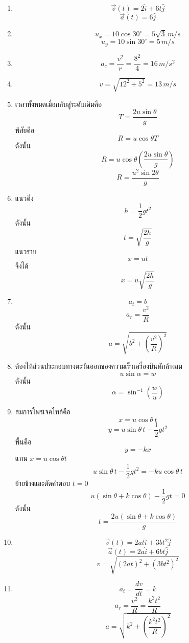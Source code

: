 \begin{enumerate}
    \item
    \[
    \vec{v}(t)=2\hat{i}+6t\hat{j}
    \]
    \[
    \vec{a}(t)=6\hat{j}
    \]

    \item
    \[
    u_x=10\cos30^\circ=5\sqrt{3}\,\si{m/s}
    \]
    \[
    u_y=10\sin30^\circ=5\,\si{m/s}
    \]

    \item
    \[
    a_c=\frac{v^2}{r}=\frac{8^2}{4}=16\,\si{m/s^2}
    \]

    \item
    \[
    v=\sqrt{12^2+5^2}=13\,\si{m/s}
    \]

    \item
    เวลาทั้งหมดเมื่อกลับสู่ระดับเดิมคือ
    \[
    T=\frac{2u\sin\theta}{g}
    \]
    พิสัยคือ
    \[
    R=u\cos\theta T
    \]
    ดังนั้น
    \[
    R=u\cos\theta\left(\frac{2u\sin\theta}{g}\right)
    \]
    \[
    R=\frac{u^2\sin2\theta}{g}
    \]

    \item
    แนวดิ่ง
    \[
    h=\frac{1}{2}gt^2
    \]
    ดังนั้น
    \[
    t=\sqrt{\frac{2h}{g}}
    \]
    แนวราบ
    \[
    x=ut
    \]
    จึงได้
    \[
    x=u\sqrt{\frac{2h}{g}}
    \]

    \item
    \[
    a_t=b
    \]
    \[
    a_r=\frac{v^2}{R}
    \]
    ดังนั้น
    \[
    a=\sqrt{b^2+\left(\frac{v^2}{R}\right)^2}
    \]

    \item
    ต้องให้ส่วนประกอบทางตะวันออกของความเร็วเครื่องบินหักล้างลม
    \[
    u\sin\alpha=w
    \]
    ดังนั้น
    \[
    \alpha=\sin^{-1}\left(\frac{w}{u}\right)
    \]

    \item
    สมการโพรเจคไทล์คือ
    \[
    x=u\cos\theta\,t
    \]
    \[
    y=u\sin\theta\,t-\frac{1}{2}gt^2
    \]
    พื้นคือ
    \[
    y=-kx
    \]
    แทน $x=u\cos\theta t$
    \[
    u\sin\theta\,t-\frac{1}{2}gt^2=-ku\cos\theta\,t
    \]
    ย้ายข้างและตัดคำตอบ $t=0$
    \[
    u(\sin\theta+k\cos\theta)-\frac{1}{2}gt=0
    \]
    ดังนั้น
    \[
    t=\frac{2u(\sin\theta+k\cos\theta)}{g}
    \]

    \item
    \[
    \vec{v}(t)=2at\hat{i}+3bt^2\hat{j}
    \]
    \[
    \vec{a}(t)=2a\hat{i}+6bt\hat{j}
    \]
    \[
    v=\sqrt{(2at)^2+(3bt^2)^2}
    \]

    \item
    \[
    a_t=\frac{dv}{dt}=k
    \]
    \[
    a_r=\frac{v^2}{R}=\frac{k^2t^2}{R}
    \]
    \[
    a=\sqrt{k^2+\left(\frac{k^2t^2}{R}\right)^2}
    \]


\end{enumerate}
